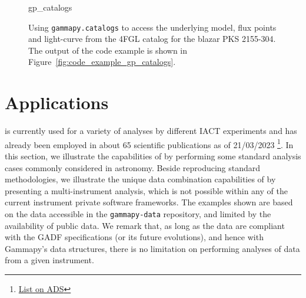 \documentclass[longauth]{aa}
\newcommand{\code}[1]{\texttt{#1}}
\begin{document}
\begin{figure}
	\small
	{gp_catalogs}
	\caption{Using \code{gammapy.catalogs} to access the underlying model, flux points and
		light-curve from the \fermi 4FGL catalog for the blazar PKS 2155-304. The output
		of the code example is shown in Figure~\ref{fig:code_example_gp_catalogs}.
	}
	\label{fig*:minted:gp_catalogs}
\end{figure}



\section{Applications}
\label{sec:applications}
\gammapy is currently used for a variety of analyses by different IACT
experiments and has already been employed in about 65 scientific publications as of 21/03/2023
\footnote{\href{https://ui.adsabs.harvard.edu/search/q=(\%20(citations(doi\%3A\%2210.1051\%2F0004-6361\%2F201834938\%22)\%20OR\%20citations(bibcode\%3A2017ICRC...35..766D))\%20AND\%20year\%3A2014-2023)&sort=date\%20desc\%2C\%20bibcode\%20desc&p_=0}{List on ADS}}.
In this section, we illustrate the capabilities of \gammapy by performing some standard
analysis cases commonly considered in \gammaray astronomy.
Beside reproducing standard methodologies, we illustrate the unique data combination
capabilities of \gammapy by presenting a multi-instrument analysis, which is not possible within any
of the current instrument private software frameworks.
The examples shown are based on the data accessible in the \code{gammapy-data} repository,
and limited by the availability of public data.
We remark that, as long as the data are compliant with the GADF specifications (or its future evolutions),
and hence with Gammapy's data structures, there is no limitation on performing
analyses of data from a given instrument.
\end{document}
